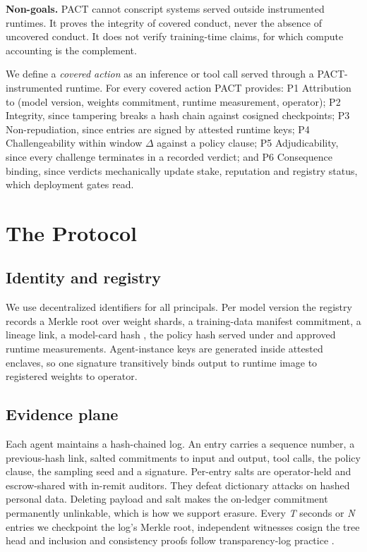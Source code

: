 \documentclass[conference]{IEEEtran}
\begin{document}
\textbf{Non-goals.} PACT cannot conscript systems served outside instrumented runtimes. It proves the integrity of covered conduct, never the absence of uncovered conduct. It does not verify training-time claims, for which compute accounting \cite{r4} is the complement.

We define a \textit{covered action} as an inference or tool call served through a PACT-instrumented runtime. For every covered action PACT provides: P1 Attribution to (model version, weights commitment, runtime measurement, operator); P2 Integrity, since tampering breaks a hash chain against cosigned checkpoints; P3 Non-repudiation, since entries are signed by attested runtime keys; P4 Challengeability within window $\Delta$ against a policy clause; P5 Adjudicability, since every challenge terminates in a recorded verdict; and P6 Consequence binding, since verdicts mechanically update stake, reputation and registry status, which deployment gates read.

\section{The Protocol}

\subsection{Identity and registry}

We use decentralized identifiers for all principals. Per model version the registry records a Merkle root over weight shards, a training-data manifest commitment, a lineage link, a model-card hash \cite{r13}, the policy hash served under and approved runtime measurements. Agent-instance keys are generated inside attested enclaves, so one signature transitively binds output to runtime image to registered weights to operator.

\subsection{Evidence plane}

Each agent maintains a hash-chained log. An entry carries a sequence number, a previous-hash link, salted commitments to input and output, tool calls, the policy clause, the sampling seed and a signature. Per-entry salts are operator-held and escrow-shared with in-remit auditors. They defeat dictionary attacks on hashed personal data. Deleting payload and salt makes the on-ledger commitment permanently unlinkable, which is how we support erasure. Every \textit{T} seconds or \textit{N} entries we checkpoint the log's Merkle root, independent witnesses cosign the tree head \cite{r21} and inclusion and consistency proofs follow transparency-log practice \cite{r1}.
\end{document}
